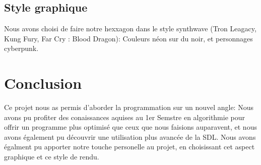 \documentclass{report}
\begin{document}
	\subsection{Style graphique}
	
		Nous avons choisi de faire notre hexxagon dans le style synthwave (Tron Leagacy, Kung Fury, Far Cry : Blood Dragon): Couleurs néon sur du noir, et personnages cyberpunk.

\newpage
\section{Conclusion}

	Ce projet nous as permis d'aborder la programmation sur un nouvel angle: Nous avons pu profiter des conaissances aquises au 1er Semstre en algorithmie pour offrir un programme plus optimisé que ceux que nous faisions auparavent, et nous avons également pu découvrir une utilisation plus avancée de la SDL. Nous avons égalment pu apporter notre touche personelle au projet, en choisissant cet aspect graphique et ce style de rendu.
\end{document}
